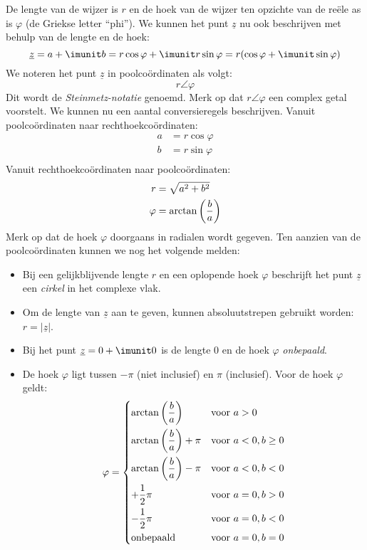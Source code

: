 De lengte van de wijzer is $r$ en de hoek van de wijzer ten opzichte van de reële as is $\varphi$ (de Griekse letter ``phi''). We kunnen het punt $\underline{z}$ nu ook beschrijven met behulp van de lengte en de hoek:
%
\begin{equation}
\underline{z} = a + \imunit b = r\cos\varphi + \imunit r\sin\varphi = r(\cos\varphi + \imunit\sin\varphi)
\end{equation}
%
We noteren het punt $\underline{z}$ in poolcoördinaten als volgt:
\begin{equation}
r\angle\varphi
\end{equation}
%
Dit wordt de \textsl{Steinmetz-notatie} genoemd. Merk op dat $r\angle\varphi$ een complex getal voorstelt.
We kunnen nu een aantal conversieregels beschrijven. Vanuit poolcoördinaten naar rechthoekcoördinaten:
%
\begin{equation}
\begin{split}
a &= r\cos\varphi \\
b &= r\sin\varphi \\
\end{split}
\end{equation}
Vanuit rechthoekcoördinaten naar poolcoördinaten:
\begin{equation}
\begin{split}
r       &= \sqrt{\mathstrut a^2 + b ^2} \\
\varphi &= \arctan\left(\dfrac{b}{a}\right)
\end{split}
\end{equation}
%
Merk op dat de hoek $\varphi$ doorgaans in radialen wordt gegeven.
Ten aanzien van de poolcoördinaten kunnen we nog het volgende melden:
\begin{itemize}
\item Bij een gelijkblijvende lengte $r$ en een oplopende hoek $\varphi$ beschrijft het punt $\underline{z}$ een \textsl{cirkel} in het complexe vlak.
\item Om de lengte van $\underline{z}$ aan te geven, kunnen absoluutstrepen gebruikt worden: $r=|\underline{z}|$.
\item Bij het punt $\underline{z} = 0 + \imunit0$ is de lengte 0 en de hoek $\varphi$ \textsl{onbepaald}.
\item De hoek $\varphi$ ligt tussen $-\pi$ (niet inclusief) en $\pi$ (inclusief). Voor de hoek $\varphi$ geldt:
\begin{equation}
\varphi = \begin{dcases}
\arctan\left(\frac{b}{a}\right)       & \text{voor } a>0 \\
\arctan\left(\frac{b}{a}\right) + \pi & \text{voor } a<0, b \geq 0 \\
\arctan\left(\frac{b}{a}\right) - \pi & \text{voor } a<0, b < 0 \\
+\dfrac{1}{2}\pi                      & \text{voor } a=0, b > 0 \\
-\dfrac{1}{2}\pi                      & \text{voor } a=0, b < 0 \\
\text{onbepaald}                      & \text{voor } a=0, b = 0
\end{dcases}
\end{equation}
\end{itemize}


